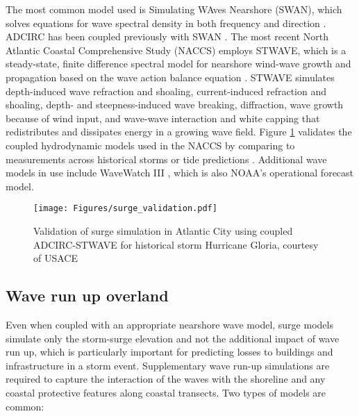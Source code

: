 The most common model used is Simulating WAves Nearshore (SWAN), which solves equations for wave spectral density in both frequency and direction \citep{zijlema2010computation}. ADCIRC has been coupled previously with SWAN \citep{dietrich2011modeling,kennedy2012tropical}. The most recent North Atlantic Coastal Comprehensive Study (NACCS) \citep{usace2015north} employs STWAVE, which is a steady-state, finite difference spectral model for nearshore wind-wave growth and propagation based on the wave action balance equation \citep{smith2001stwave}. STWAVE simulates depth-induced wave refraction and shoaling, current-induced refraction and shoaling, depth- and steepness-induced wave breaking, diffraction, wave growth because of wind input, and wave-wave interaction and white capping that redistributes and dissipates energy in a growing wave field. Figure \ref{fig:surge_validation} validates the coupled hydrodynamic models used in the NACCS by comparing to measurements across historical storms or tide predictions \citep{nadal-caraballo2015north}. Additional wave models in use include WaveWatch III \citep{smith2018validation}, which is also NOAA's operational forecast model. 

\begin{figure}[htb]
    \centering
    \texttt{[image: Figures/surge\_validation.pdf]}
    \caption{Validation of surge simulation in Atlantic City using coupled ADCIRC-STWAVE for historical storm Hurricane Gloria, courtesy of USACE \citep{nadal-caraballo2015north}}
    \label{fig:surge_validation}
\end{figure}

\subsection{Wave run up overland}

Even when coupled with an appropriate nearshore wave model, surge models simulate only the storm-surge elevation and not the additional impact of wave run up, which is particularly important for predicting losses to buildings and infrastructure in a storm event. Supplementary wave run-up simulations are required to capture the interaction of the waves with the shoreline and any coastal protective features along coastal transects. Two types of models are common:

